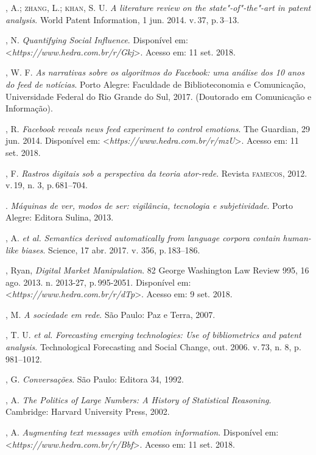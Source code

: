 \begin{bibliohedra}
, A.; \textsc{zhang}, L.; \textsc{khan}, S. U. \emph{A literature review on the
state"-of"-the"-art in patent analysis}. World Patent Information, 1 jun.
2014. v.\,37, p.\,3--13.

, N. \emph{Quantifying Social Influence}. Disponível em:
\textless{}\emph{https://www.hedra.com.br/r/Gkj}\textgreater{}. Acesso em: 11 set. 2018.

, W. F. \emph{As narrativas sobre os algoritmos do Facebook: uma
análise dos 10 anos do feed de notícias}. Porto Alegre: Faculdade de
Biblioteconomia e Comunicação, Universidade Federal do Rio Grande do
Sul, 2017. (Doutorado em Comunicação e Informação).

, R. \emph{Facebook reveals news feed experiment to control
emotions}. The Guardian, 29 jun. 2014. Disponível em:
\textless{}\emph{https://www.hedra.com.br/r/mzU}\textgreater{}. Acesso em: 11 set. 2018.

, F. \emph{Rastros digitais sob a perspectiva da teoria
ator-rede}. Revista \textsc{famecos}, 2012. v.\,19, n. 3, p.\,681--704.

\titidem. \emph{Máquinas de ver, modos de ser: vigilância,
tecnologia e subjetividade}. Porto Alegre: Editora Sulina, 2013.

, A. \emph{et al.} \emph{Semantics derived automatically from
language corpora contain human-like biases}. Science, 17 abr. 2017. v.
356, p.\,183--186.

, Ryan, \emph{Digital Market Manipulation}. 82 George Washington
Law Review 995, 16 ago. 2013. n. 2013-27, p.\,995-2051. Disponível em:
\textless{}\emph{https://www.hedra.com.br/r/dTp}\textgreater{}. Acesso em: 9 set. 2018.

, M. \emph{A sociedade em rede}. São Paulo: Paz e Terra, 2007.

, T. U. \emph{et al.} \emph{Forecasting emerging technologies: Use
of bibliometrics and patent analysis}. Technological Forecasting and
Social Change, out. 2006. v.\,73, n. 8, p.\,981--1012.

, G. \emph{Conversações}. São Paulo: Editora 34, 1992.

, A. \emph{The Politics of Large Numbers: A History of
Statistical Reasoning}. Cambridge: Harvard University Press, 2002.

, A. \emph{Augmenting text messages with emotion information}.
Disponível em: \textless{}\emph{https://www.hedra.com.br/r/Bbf}\textgreater{}. Acesso em: 11 set. 2018.


\end{bibliohedra}
